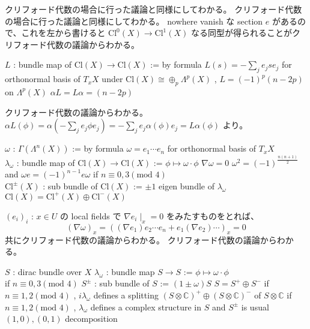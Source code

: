 \begin{Proof}
\itemprof
  クリフォード代数の場合に行った議論と同様にしてわかる。
\itemprof
  クリフォード代数の場合に行った議論と同様にしてわかる。
\itemprof
  nowhere vanish な section \(e\) があるので、これを左から書けると \(\text{Cl}^0(X) \to \text{Cl}^1(X)\) なる同型が得られることがクリフォード代数の議論からわかる。
\end{Proof}

\begin{Theorem}
\itemdefi
  \Define \(L\) : bundle map of \(\text{Cl}(X) \to \text{Cl}(X)\) := by formula \(L(s) = -\sum_j e_j s e_j\) for orthonormal basis of \(T_x X\)
\itemprop
  under \(\text{Cl}(X) \cong \oplus_p \Lambda^p(X)\) ,
  \(L = (-1)^p(n - 2p)\) on \(\Lambda^p(X)\)
\itemprof
  \(\alpha L = L \alpha = (n - 2p)\)
\end{Theorem}

\begin{Proof}
\itemprof
  クリフォード代数の議論からわかる。
\itemprof
  \(\alpha L (\phi) = \alpha (- \sum_j e_j \phi e_j) = - \sum_j e_j \alpha(\phi) e_j = L \alpha (\phi)\) より。
\end{Proof}

\begin{Theorem}
\itemdefi
  \Define \(\omega\) : \(\Gamma(\Lambda^n(X))\) := by formula \(\omega = e_1 \cdots e_n\) for orthonormal basis of \(T_x X\) \\
  \Define \(\lambda_{\omega}\) : bundle map of \(\text{Cl}(X) \to \text{Cl}(X)\) := \(\phi \mapsto \omega \cdot \phi\)
\itemprop
  \(\nabla \omega = 0\)
\itemprop
  \(\omega^2 = (-1)^{\frac{n(n+1)}{2}}\) and \(\omega e = (-1)^{n-1} e \omega\)
\itemprop
  if \(n \equiv 0 , 3 (\text{mod }4)\) \\
  \Let \(\text{Cl}^{\pm}(X)\) : sub bundle of \(\text{Cl}(X)\) := \(\pm 1\) eigen bundle of \(\lambda_{\omega}\)
  \Then \(\text{Cl}(X) = \text{Cl}^{+}(X) \oplus \text{Cl}^{-}(X)\)
\end{Theorem}

\begin{Proof}
\itemprof
  \((e_i)_i\) : \(x \in U\) の local fields で \(\nabla {e_i} \mid_x = 0\) をみたすものをとれば、
  \[(\nabla \omega)_x = ((\nabla e_1) e_2 \cdots e_n + e_1 (\nabla e_2) \cdots )_x = 0\]
\itemprof
  共にクリフォード代数の議論からわかる。
\itemprof
  クリフォード代数の議論からわかる。
\end{Proof}

\begin{Theorem}
\itemwhen
  \Fix \(S\) : dirac bundle over \(X\)
\itemdefi
  \Define \(\lambda_{\omega}\) : bundle map \(S \to S\) := \(\phi \mapsto \omega \cdot \phi\) \\
  if \(n \equiv 0 , 3(\text{mod }4)\) \Define \(S^\pm\) : sub bundle of \(S\) := \((1 \pm \omega) S\)
\itemprop
  \(S = S^{+} \oplus S^{-}\)
\itemprop
  if \(n \equiv 1 , 2(\text{mod }4)\) , 
  \(i \lambda_{\omega}\) defines a splitting \((S \otimes \mathbb{C})^{+} \oplus (S \otimes \mathbb{C})^{-}\) of \(S \otimes \mathbb{C}\)
\itemprop
  if \(n \equiv 1 , 2(\text{mod }4)\) , \(\lambda_{\omega}\) defines a complex structure in \(S\) and \(S^{\pm}\) is usual \((1,0) , (0,1)\) decomposition
\end{Theorem}

